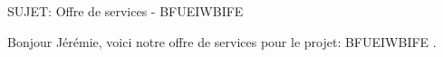 SUJET: Offre de services - BFUEIWBIFE \par Bonjour Jérémie, voici notre offre de services pour le projet: BFUEIWBIFE .